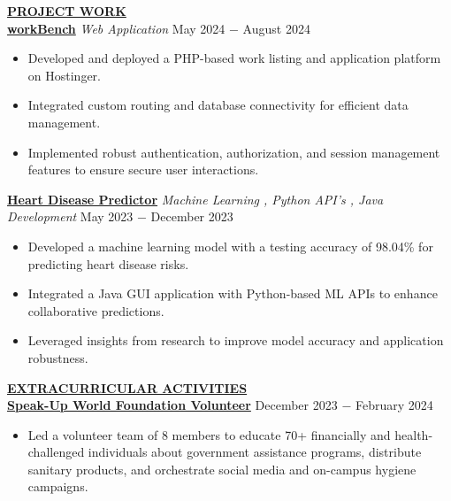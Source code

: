 \documentclass{article}
\begin{document}
%
%
\noindent \textbf{\underline{PROJECT WORK}} \\
\noindent \href{https://github.com/Yash-29-10-2003/workBench}{\textbf{workBench}} \textit{Web Application} \hfill  May 2024 $-$ August 2024
\begin{itemize}[noitemsep,nolistsep,leftmargin=*]
\item {Developed and deployed a PHP-based work listing and application platform on Hostinger.
}
\item {Integrated custom routing and database connectivity for efficient
data management.
}
\item {Implemented robust authentication, authorization, and session management features to ensure secure user interactions.
\\}
\end{itemize}

\noindent \href{https://github.com/Yash-29-10-2003/Heart-Disease-Predictor}{\textbf{Heart Disease Predictor}} \textit{Machine Learning , Python API's , Java Development} \hfill  May 2023 $-$ December 2023
\begin{itemize}[noitemsep,nolistsep,leftmargin=*]
\item { Developed a machine learning model with a testing accuracy of 98.04\% for predicting heart disease risks.}
\item {Integrated a Java GUI application with Python-based ML APIs to enhance collaborative predictions. }
\item {Leveraged insights from research to improve model accuracy and application robustness.\\}
\end{itemize}

\noindent \textbf{\underline{EXTRACURRICULAR ACTIVITIES}} \\
\noindent \href{https://speakupngo.org/}{\textbf{Speak-Up World Foundation Volunteer}} \hfill December 2023 $-$ February 2024
\begin{itemize}[noitemsep,nolistsep,leftmargin=*]
\item {Led a volunteer team of 8 members to educate 70+ financially and health-challenged individuals about government assistance programs, distribute sanitary products, and orchestrate social media and on-campus hygiene campaigns.\\}
\end{itemize}
\end{document}
